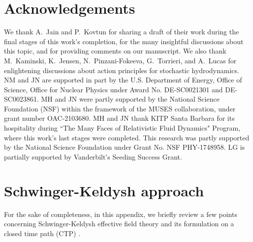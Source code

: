 \documentclass[aps,prd,nofootinbib,amsmath,amssymb,showpacs,longbibliography,singlecolumn,superscriptaddress,notitlepage]{revtex4-1}
\theoremstyle{plain}
\theoremstyle{definition}
\begin{document}
\section*{Acknowledgements}
We thank A.~Jain and P.~Kovtun for sharing a draft of their work during the final stages of this work's completion, for the many insightful discussions about this topic, and for providing comments on our manuscript. 
We also thank M.~Kaminski, K.~Jensen, N.~Pinzani-Fokeeva, G.~Torrieri, and A.~Lucas for enlightening discussions about action principles for stochastic hydrodynamics. NM and JN are supported in part by the U.S. Department of Energy, Office of Science, Office for Nuclear Physics
under Award No. DE-SC0021301 and DE-SC0023861. MH and JN were partly supported by the National Science Foundation (NSF) within the framework of the MUSES collaboration, under grant number OAC-2103680. MH and JN thank KITP Santa Barbara for its hospitality during ``The Many Faces of Relativistic Fluid Dynamics" Program, where this work's last stages were completed. This research was partly supported by the National Science Foundation under Grant No. NSF PHY-1748958. LG is partially supported by Vanderbilt's Seeding Success Grant.

\appendix

\section{Schwinger-Keldysh approach}
\label{SK_comparison}


For the sake of completeness, in this appendix, we briefly review a few points concerning Schwinger-Keldysh effective field theory and its formulation on a closed time path (CTP) \cite{Schwinger:1960qe, Keldysh:1964ud, Liu:2018kfw}. 
\end{document}
